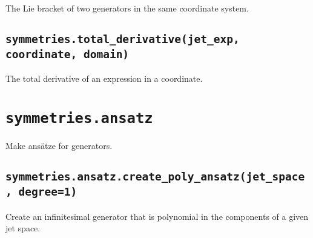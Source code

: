    The Lie bracket of two generators in the same coordinate system.

\subsection*{\lstinline{symmetries.total_derivative(jet_exp, coordinate, domain)}}

   The total derivative of an expression in a coordinate.


\section*{\lstinline{symmetries.ansatz}}

Make ansätze for generators.

\subsection*{\lstinline{symmetries.ansatz.create_poly_ansatz(jet_space, degree=1)}}

   Create an infinitesimal generator that is polynomial in the
   components of a given jet space.
